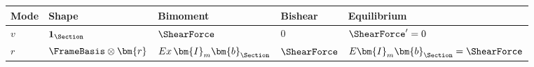 \begin{longtable}[]{@{}
  >{\raggedright\arraybackslash}p{}
  >{\raggedright\arraybackslash}p{}
  >{\raggedright\arraybackslash}p{}
  >{\raggedright\arraybackslash}p{}
  >{\raggedright\arraybackslash}p{}@{}}
\toprule\noalign{}
\begin{minipage}[b]{\linewidth}\raggedright
Mode
\end{minipage} & \begin{minipage}[b]{\linewidth}\raggedright
Shape
\end{minipage} & \begin{minipage}[b]{\linewidth}\raggedright
Bimoment
\end{minipage} & \begin{minipage}[b]{\linewidth}\raggedright
Bishear
\end{minipage} & \begin{minipage}[b]{\linewidth}\raggedright
Equilibrium
\end{minipage} \\
\midrule\noalign{}
\endhead
\bottomrule\noalign{}
\endlastfoot
\(v\) & \(\mathbf{1}_{\Section}\) & \(\ShearForce\) & \(0\) & \(\ShearForce' = 0\) \\
\(r\) & \(\FrameBasis\otimes\bm{r}\) & \(Ex\,\bm{I}_m\bm{b}_{\Section}\) &
\(\ShearForce\) & \(E\bm{I}_m\bm{b}_{\Section} = \ShearForce\) \\
\end{longtable}


